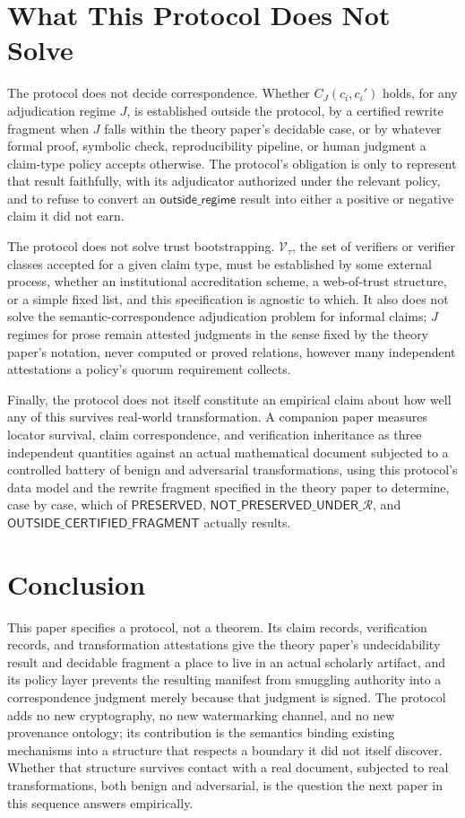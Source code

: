 \documentclass[11pt]{article}
\begin{document}
\section{What This Protocol Does Not Solve}

The protocol does not decide correspondence. Whether $C_J(c_i, c_i')$ holds, for any adjudication regime $J$, is established outside the protocol, by a certified rewrite fragment when $J$ falls within the theory paper's decidable case, or by whatever formal proof, symbolic check, reproducibility pipeline, or human judgment a claim-type policy accepts otherwise. The protocol's obligation is only to represent that result faithfully, with its adjudicator authorized under the relevant policy, and to refuse to convert an $\textsf{outside\_regime}$ result into either a positive or negative claim it did not earn.

The protocol does not solve trust bootstrapping. $\mathcal{V}_\tau$, the set of verifiers or verifier classes accepted for a given claim type, must be established by some external process, whether an institutional accreditation scheme, a web-of-trust structure, or a simple fixed list, and this specification is agnostic to which. It also does not solve the semantic-correspondence adjudication problem for informal claims; $J$ regimes for prose remain attested judgments in the sense fixed by the theory paper's notation, never computed or proved relations, however many independent attestations a policy's quorum requirement collects.

Finally, the protocol does not itself constitute an empirical claim about how well any of this survives real-world transformation. A companion paper measures locator survival, claim correspondence, and verification inheritance as three independent quantities against an actual mathematical document subjected to a controlled battery of benign and adversarial transformations, using this protocol's data model and the rewrite fragment specified in the theory paper to determine, case by case, which of $\textsf{PRESERVED}$, $\textsf{NOT\_PRESERVED\_UNDER\_}\mathcal{R}$, and $\textsf{OUTSIDE\_CERTIFIED\_FRAGMENT}$ actually results.

\section{Conclusion}

This paper specifies a protocol, not a theorem. Its claim records, verification records, and transformation attestations give the theory paper's undecidability result and decidable fragment a place to live in an actual scholarly artifact, and its policy layer prevents the resulting manifest from smuggling authority into a correspondence judgment merely because that judgment is signed. The protocol adds no new cryptography, no new watermarking channel, and no new provenance ontology; its contribution is the semantics binding existing mechanisms into a structure that respects a boundary it did not itself discover. Whether that structure survives contact with a real document, subjected to real transformations, both benign and adversarial, is the question the next paper in this sequence answers empirically.
\end{document}
